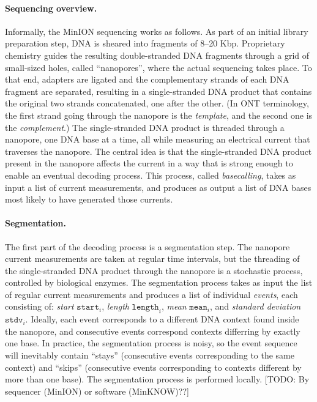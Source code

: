 \documentclass{bioinfo}
\begin{document}
\paragraph{Sequencing overview.}
Informally, the MinION sequencing works as follows. As part of an initial library preparation step, DNA is sheared into fragments of 8--20 Kbp. Proprietary chemistry guides the resulting double-stranded DNA fragments through a grid of small-sized holes, called ``nanopores'', where the actual sequencing takes place. To that end, adapters are ligated and the complementary strands of each DNA fragment are separated, resulting in a single-stranded DNA product that contains the original two strands concatenated, one after the other. (In ONT terminology, the first strand going through the nanopore is the \emph{template}, and the second one is the \emph{complement}.) The single-stranded DNA product is threaded through a nanopore, one DNA base at a time, all while measuring an electrical current that traverses the nanopore. The central idea is that the single-stranded DNA product present in the nanopore affects the current in a way that is strong enough to enable an eventual decoding process. This process, called \emph{basecalling}, takes as input a list of current measurements, and produces as output a list of DNA bases most likely to have generated those currents.

\paragraph{Segmentation.}
The first part of the decoding process is a segmentation step. The nanopore current measurements are taken at regular time intervals, but the threading of the single-stranded DNA product through the nanopore is a stochastic process, controlled by biological enzymes. The segmentation process takes as input the list of regular current measurements and produces a list of individual \emph{events}, each consisting of: \emph{start} $\texttt{start}_i$, \emph{length} $\texttt{length}_i$, \emph{mean} $\texttt{mean}_i$, and \emph{standard deviation} $\texttt{stdv}_i$. Ideally, each event corresponds to a different DNA context found inside the nanopore, and consecutive events correspond contexts differring by exactly one base. In practice, the segmentation process is noisy, so the event sequence will inevitably contain ``stays'' (consecutive events corresponding to the same context) and ``skips'' (consecutive events corresponding to contexts different by more than one base). The segmentation process is performed locally. [TODO: By sequencer (MinION) or software (MinKNOW)??]
\end{document}
